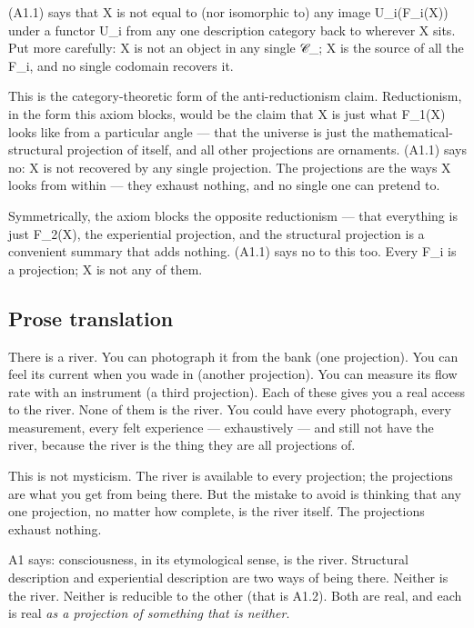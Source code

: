 \documentclass[11pt, openany]{book}
\begin{document}
(A1.1) says that X is not equal to (nor isomorphic to) any image U\_\allowbreak{}i(F\_\allowbreak{}i(X)) under a functor U\_\allowbreak{}i from any one description category back to wherever X sits. Put more carefully: X is not an object in any single 𝒞\_; X is the source of all the F\_\allowbreak{}i, and no single codomain recovers it.

This is the category-theoretic form of the anti-reductionism claim. Reductionism, in the form this axiom blocks, would be the claim that X is just what F\_\allowbreak{}1(X) looks like from a particular angle --- that the universe is just the mathematical-structural projection of itself, and all other projections are ornaments. (A1.1) says no: X is not recovered by any single projection. The projections are the ways X looks from within --- they exhaust nothing, and no single one can pretend to.

Symmetrically, the axiom blocks the opposite reductionism --- that everything is just F\_\allowbreak{}2(X), the experiential projection, and the structural projection is a convenient summary that adds nothing. (A1.1) says no to this too. Every F\_\allowbreak{}i is a projection; X is not any of them.

\subsection{Prose translation}

There is a river. You can photograph it from the bank (one projection). You can feel its current when you wade in (another projection). You can measure its flow rate with an instrument (a third projection). Each of these gives you a real access to the river. None of them is the river. You could have every photograph, every measurement, every felt experience --- exhaustively --- and still not have the river, because the river is the thing they are all projections of.

This is not mysticism. The river is available to every projection; the projections are what you get from being there. But the mistake to avoid is thinking that any one projection, no matter how complete, is the river itself. The projections exhaust nothing.

A1 says: consciousness, in its etymological sense, is the river. Structural description and experiential description are two ways of being there. Neither is the river. Neither is reducible to the other (that is A1.2). Both are real, and each is real \textit{as a projection of something that is neither}.
\end{document}

